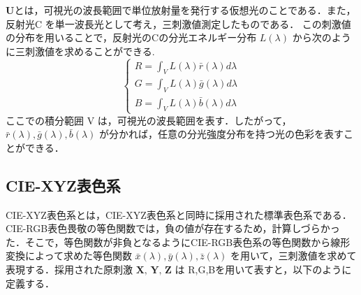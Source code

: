 \documentclass[
]{article}
\begin{document}
\(\textbf{U}\)とは，可視光の波長範囲で単位放射量を発行する仮想光のことである．また，反射光C
を単一波長光として考え，三刺激値測定したものである．
この刺激値の分布を用いることで，反射光のCの分光エネルギー分布
\(L(\lambda)\) から次のように三刺激値を求めることができる.
\begin{equation}
\left\{
\begin{aligned} 
    R = \int_V L(\lambda)\bar{r}(\lambda)d\lambda\\
    G = \int_V L(\lambda)\bar{g}(\lambda)d\lambda\\
    B = \int_V L(\lambda)\bar{b}(\lambda)d\lambda
\end{aligned}
\right.
\end{equation}
ここでの積分範囲 V
は，可視光の波長範囲を表す．したがって，\(\bar{r}(\lambda), \bar{g}(\lambda), \bar{b}(\lambda)\)
が分かれば，任意の分光強度分布を持つ光の色彩を表すことができる．

\hypertarget{cie-xyzux8868ux8272ux7cfb}{%
\subsection{CIE-XYZ表色系}\label{cie-xyzux8868ux8272ux7cfb}}

CIE-XYZ表色系とは，CIE-XYZ表色系と同時に採用された標準表色系である．CIE-RGB表色畏敬の等色関数では，負の値が存在するため，計算しづらかった．そこで，等色関数が非負となるようにCIE-RGB表色系の等色関数から線形変換によって求めた等色関数
\(\bar{x}(\lambda), \bar{y}(\lambda), \bar{z}(\lambda)\)
を用いて，三刺激値を求めて表現する．採用された原刺激
\(\textbf{X, Y, Z}\) は R,G,Bを用いて表すと，以下のように定義する．
\end{document}
